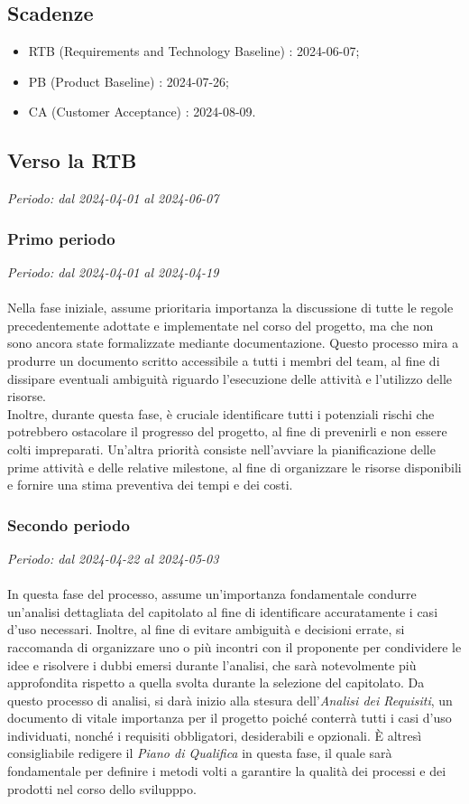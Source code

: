 \subsection{Scadenze}
\begin{itemize}
    \item RTB (Requirements and Technology Baseline) : 2024-06-07;
    \item PB (Product Baseline) : 2024-07-26;
    \item CA (Customer Acceptance) : 2024-08-09.
\end{itemize}
\subsection{Verso la RTB}
\textit{Periodo: dal 2024-04-01 al 2024-06-07}
\subsubsection{Primo periodo}
\textit{Periodo: dal 2024-04-01 al 2024-04-19}
\\\\
Nella fase iniziale, assume prioritaria importanza la discussione di tutte le regole precedentemente adottate e implementate nel corso del progetto, ma che non sono ancora state formalizzate mediante documentazione. Questo processo mira a produrre un documento scritto accessibile a tutti i membri del team, al fine di dissipare eventuali ambiguità riguardo l'esecuzione delle attività e l'utilizzo delle risorse.
\\
Inoltre, durante questa fase, è cruciale identificare tutti i potenziali rischi che potrebbero ostacolare il progresso del progetto, al fine di prevenirli e non essere colti impreparati. Un'altra priorità consiste nell'avviare la pianificazione delle prime attività e delle relative milestone, al fine di organizzare le risorse disponibili e fornire una stima preventiva dei tempi e dei costi.

\subsubsection{Secondo periodo}
\textit{Periodo: dal 2024-04-22 al 2024-05-03}
\\\\
In questa fase del processo, assume un'importanza fondamentale condurre un'analisi dettagliata del capitolato al fine di identificare accuratamente i casi d'uso necessari. Inoltre, al fine di evitare ambiguità e decisioni errate, si raccomanda di organizzare uno o più incontri con il proponente per condividere le idee e risolvere i dubbi emersi durante l'analisi, che sarà notevolmente più approfondita rispetto a quella svolta durante la selezione del capitolato.
Da questo processo di analisi, si darà inizio alla stesura dell'\textit{Analisi dei Requisiti}, un documento di vitale importanza per il progetto poiché conterrà tutti i casi d'uso individuati, nonché i requisiti obbligatori, desiderabili e opzionali.
È altresì consigliabile redigere il \textit{Piano di Qualifica} in questa fase, il quale sarà fondamentale per definire i metodi volti a garantire la qualità dei processi e dei prodotti nel corso dello svilupppo.

